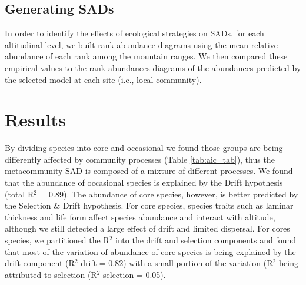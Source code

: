 \documentclass[12pt]{article}
\begin{document}
\subsection*{Generating SADs}

In order to identify the effects of ecological strategies on SADs, for each altitudinal level, we built rank-abundance diagrams using the mean relative abundance of each rank among the mountain ranges. We then compared these empirical
values to the rank-abundances diagrams of the abundances predicted by the selected model at each site (i.e., local community). 

\section*{Results}


By dividing species into core and occasional we found those groups are being differently affected by community processes (Table \ref{tab:aic_tab}), thus the metacommunity SAD is composed of a mixture of different processes. We found that the abundance of occasional species is explained by the Drift hypothesis (total R$^2$ = 0.89). The abundance of core species, however, is better predicted by the Selection \& Drift hypothesis. For core species, species traits such as laminar thickness and life form affect species abundance and interact with altitude, although we still detected a large effect of drift and limited dispersal. For cores species, we partitioned the R$^2$ into the drift and selection components and found that most of the variation of abundance of core species is being explained by the drift component (R$^2$ drift = 0.82) with a small portion of the variation (R{$^2$} being attributed to selection (R$^2$ selection = 0.05). 
\end{document}
